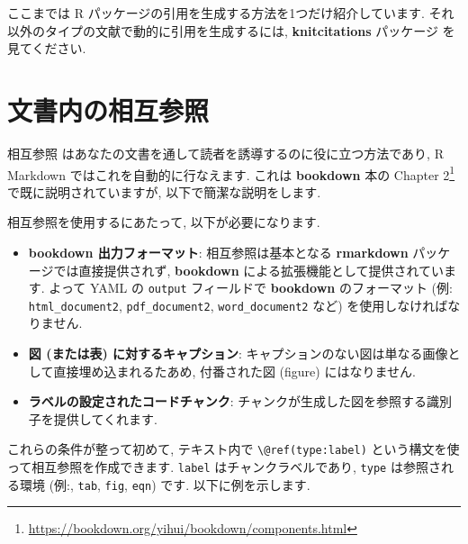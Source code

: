 \documentclass[
  11pt,
  lualatex,
  ja=standard]{bxjsreport}
\renewcommand{\href}[2]{#2\footnote{\url{#1}}}
\begin{document}
ここまでは R パッケージの引用を生成する方法を1つだけ紹介しています. それ以外のタイプの文献で動的に引用を生成するには, \textbf{knitcitations} パッケージ \autocite{R-knitcitations} を見てください.

\hypertarget{cross-ref}{%
\section{文書内の相互参照}\label{cross-ref}}

相互参照 はあなたの文書を通して読者を誘導するのに役に立つ方法であり, R Markdown ではこれを自動的に行なえます. これは \textbf{bookdown} 本の \href{https://bookdown.org/yihui/bookdown/components.html}{Chapter 2} で既に説明されていますが, 以下で簡潔な説明をします.

相互参照を使用するにあたって, 以下が必要になります.

\begin{itemize}
\item
  \textbf{bookdown 出力フォーマット}: 相互参照は基本となる \textbf{rmarkdown} パッケージでは直接提供されず, \textbf{bookdown} \autocite{R-bookdown} による拡張機能として提供されています. よって YAML の \texttt{output} フィールドで \textbf{bookdown} のフォーマット (例: \texttt{html\_document2}, \texttt{pdf\_document2}, \texttt{word\_document2} など) を使用しなければなりません.
\item
  \textbf{図 (または表) に対するキャプション}: キャプションのない図は単なる画像として直接埋め込まれるたあめ, 付番された図 (figure) にはなりません.
\item
  \textbf{ラベルの設定されたコードチャンク}: チャンクが生成した図を参照する識別子を提供してくれます.
\end{itemize}

これらの条件が整って初めて, テキスト内で \texttt{\textbackslash{}@ref(type:label)} という構文を使って相互参照を作成できます. \texttt{label} はチャンクラベルであり, \texttt{type} は参照される環境 (例:, \texttt{tab}, \texttt{fig}, \texttt{eqn}) です. 以下に例を示します.
\end{document}
